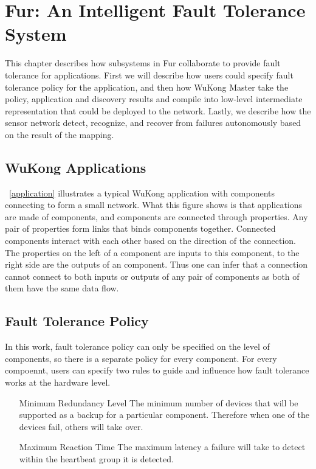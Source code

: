 \chapter{Fur: An Intelligent Fault Tolerance System}
\label{c:fur}

This chapter describes how subsystems in Fur collaborate to provide fault tolerance
for applications. First we will describe how users could specify fault
tolerance policy for the application, and then how WuKong Master take
the policy, application and discovery results and compile into low-level
intermediate representation that could be deployed to the network. Lastly, we 
describe how the sensor network detect, recognize, and recover from failures
autonomously based on the result of the mapping.

\section{WuKong Applications}

~\ref{application} illustrates a typical WuKong application with components
connecting to form a small network. What this figure shows is that applications
are made of components, and components are connected through properties.
Any pair of properties form links that binds components together. Connected
components interact with each other based on the direction of the connection.
The properties on the left of a component are inputs to this component, to the
right side are the outputs of an component. Thus one can infer that
a connection cannot connect to both inputs or outputs of any pair of components
as both of them have the same data flow.

\section{Fault Tolerance Policy}

In this work, fault tolerance policy can only be specified on the level of
components, so there is a separate policy for every component. For every
compoennt, users can specify two rules to guide and influence how fault
tolerance works at the hardware level.

\begin{enumerate}
\item[Minimum Redundancy Level] The minimum number of devices that will be
supported as a backup for a particular component. Therefore when one of the
devices fail, others will take over.
\item[Maximum Reaction Time] The maximum latency a failure will take to detect
within the heartbeat group it is detected.
\end{enumerate}

